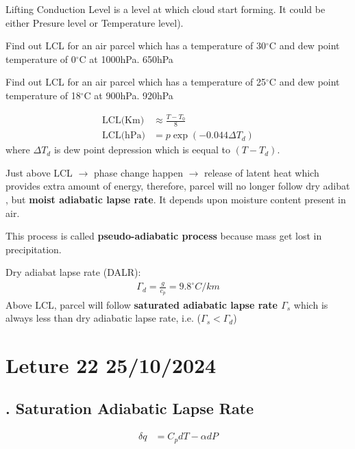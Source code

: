 \documentclass[fleqn,10pt]{SelfArx} %
\begin{document}
Lifting Conduction Level is a level at which cloud start forming. It could be either Presure level or Temperature level).

\begin{question}[\label=21.1]{Find out LCL for an air parcel which has a temperature of 30$^\circ$C and dew point temperature of 0$^\circ$C at 1000hPa.}
    \Rightarrow 650hPa
\end{question}

\begin{question}[\label=21.2]{Find out LCL for an air parcel which has a temperature of 25$^\circ$C and dew point temperature of 18$^\circ$C at 900hPa.}
    \Rightarrow 920hPa
\end{question}

\begin{align}
    \text{LCL(Km)} &\approx \frac{T-T_0}{8} \\
    \text{LCL(hPa)} &= p \exp(-0.044\Delta T_d)
\end{align}
where $\Delta T_d$ is dew point depression which is eequal to $(T-T_d)$.

Just above LCL $\rightarrow$ phase change happen $\rightarrow$ release of latent heat which provides extra amount of energy, therefore, parcel will no longer follow dry adibat , but \textbf{moist adiabatic lapse rate}. It depends upon moisture content present in air.

This process is called \textbf{pseudo-adiabatic process} because mass get lost in precipitation. \newline

Dry adiabat lapse rate (DALR):
\begin{align*}
    \Gamma_d = \frac{g}{c_p}= 9.8^\circ C/km
\end{align*}
Above LCL, parcel will follow \textbf{saturated adiabatic lapse rate $\Gamma_s$} which is always less than dry adiabatic lapse rate, i.e. ($\Gamma_s < \Gamma_d$)

\clearpage

\section{Leture 22 25/10/2024}
\subsection{. Saturation Adiabatic Lapse Rate }
\begin{align}
    \delta q &= C_p dT - \alpha dP
\end{align}
\end{document}
